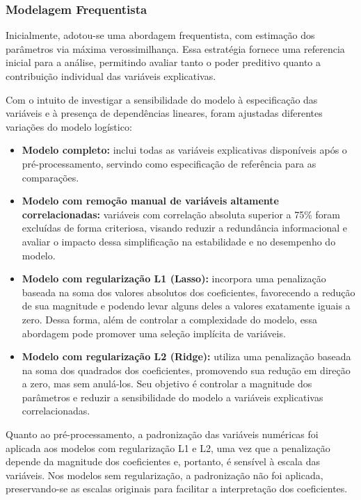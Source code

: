 \documentclass[
  brazilian,
  12pt,
  letterpaper,
  DIV=11,
  numbers=noendperiod]{scrartcl}
\begin{document}
\subsubsection{Modelagem Frequentista}\label{modelagem-frequentista}

Inicialmente, adotou-se uma abordagem frequentista, com estimação dos
parâmetros via máxima verossimilhança. Essa estratégia fornece uma
referencia inicial para a análise, permitindo avaliar tanto o poder
preditivo quanto a contribuição individual das variáveis explicativas.

Com o intuito de investigar a sensibilidade do modelo à especificação
das variáveis e à presença de dependências lineares, foram ajustadas
diferentes variações do modelo logístico:

\begin{itemize}
\item
  \textbf{Modelo completo:} inclui todas as variáveis explicativas
  disponíveis após o pré-processamento, servindo como especificação de
  referência para as comparações.
\item
  \textbf{Modelo com remoção manual de variáveis altamente
  correlacionadas:} variáveis com correlação absoluta superior a 75\%
  foram excluídas de forma criteriosa, visando reduzir a redundância
  informacional e avaliar o impacto dessa simplificação na estabilidade
  e no desempenho do modelo.
\item
  \textbf{Modelo com regularização L1 (Lasso):} incorpora uma
  penalização baseada na soma dos valores absolutos dos coeficientes,
  favorecendo a redução de sua magnitude e podendo levar alguns deles a
  valores exatamente iguais a zero. Dessa forma, além de controlar a
  complexidade do modelo, essa abordagem pode promover uma seleção
  implícita de variáveis.
\item
  \textbf{Modelo com regularização L2 (Ridge):} utiliza uma penalização
  baseada na soma dos quadrados dos coeficientes, promovendo sua redução
  em direção a zero, mas sem anulá-los. Seu objetivo é controlar a
  magnitude dos parâmetros e reduzir a sensibilidade do modelo a
  variáveis explicativas correlacionadas.
\end{itemize}

Quanto ao pré-processamento, a padronização das variáveis numéricas foi
aplicada aos modelos com regularização L1 e L2, uma vez que a
penalização depende da magnitude dos coeficientes e, portanto, é
sensível à escala das variáveis. Nos modelos sem regularização, a
padronização não foi aplicada, preservando-se as escalas originais para
facilitar a interpretação dos coeficientes.
\end{document}
